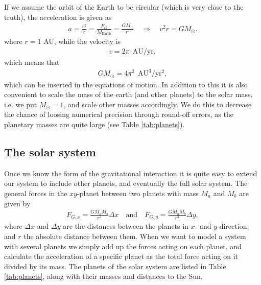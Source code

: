 \documentclass[12pt, a4paper]{article}
\begin{document}
If we assume the orbit 
of the Earth to be circular (which is very close to the truth), the acceleration is given as 
\begin{align*}
a = \frac{v^2}{r} = \frac{F_G}{M_{\text{Earth}}} = \frac{GM_{\odot}}{r^2} \quad \Rightarrow \quad 
v^2 r = GM_{\odot}. 
\end{align*}  
where $r = 1$ AU, while the velocity is 
\begin{align*}
v = 2\pi \:\: \text{AU/yr},   
\end{align*}
which means that 
\begin{align*}
GM_{\odot} = 4\pi^2 \:\: \text{AU}^3/\text{yr}^2,  
\end{align*}
which can be inserted in the equations of motion. In addition to this it is also 
convenient to scale the mass of the earth (and other planets) to the solar mass, i.e. we put 
$M_{\odot} = 1$, and scale other masses accordingly. We do this to decrease the chance of loosing 
numerical precision through round-off errors, as the planetary masses are quite large (see Table  
\ref{tab:planets}). 

\subsection{The solar system}

Once we know the form of the gravitational interaction it is quite easy to extend our system to include 
other planets, and eventually the full solar system. The general forces in the $xy$-planet  
between two planets with mass $M_a$ and $M_b$ are given by 
\begin{align*}
F_{G,x} = \frac{GM_aM_b}{r^3}\Delta x \quad \text{and} \quad F_{G,y} = \frac{GM_aM_b}{r^3}\Delta y, 
\end{align*}  
where $\Delta x$ and $\Delta y$ are the distances between the planets in $x$- and $y$-direction, and 
$r$ the absolute distance between them. When we want to model a system with several planets we simply 
add up the forces acting on each planet, and calculate the acceleration of a specific planet as 
the total force acting on it divided by its mass. The planets of the solar system are listed in Table 
\ref{tab:planets}, along with their masses and distances to the Sun.   
\end{document}
